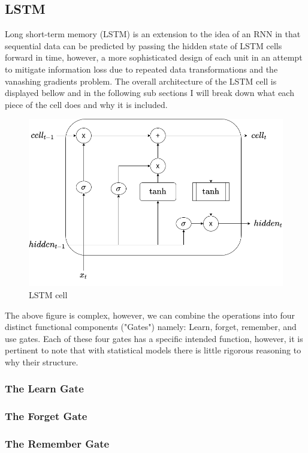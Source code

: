 \documentclass{article}
\begin{document}
\subsection{LSTM}
\label{sec:LSTM}
Long short-term memory (LSTM) is an extension to the idea of an RNN in that sequential data can be predicted by passing the hidden state of LSTM cells forward in time, however, a more sophisticated design of each unit in an attempt to mitigate information loss due to repeated data transformations and the vanashing gradients problem. The overall architecture of the LSTM cell is displayed bellow and in the following sub sections I will break down what each piece of the cell does and why it is included. 
\begin{figure}[H]
\caption{LSTM cell \cite{LSTM}}
\label{fig:RNN}
\includegraphics[scale=0.4]{LSTM_cell.png}
\end{figure}
The above figure is complex, however, we can combine the operations into four distinct functional components ("Gates") namely: Learn, forget, remember, and use gates. Each of these four gates has a specific intended function, however, it is pertinent to note that with statistical models there is little rigorous reasoning to why their structure.
\subsubsection{The Learn Gate} 
\subsubsection{The Forget Gate} 
\subsubsection{The Remember Gate} 
\end{document}
